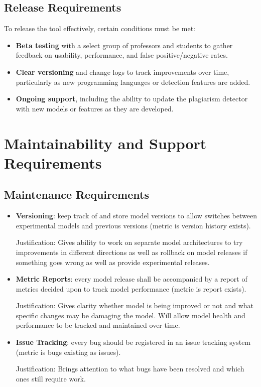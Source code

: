 \documentclass[12pt]{article}
\begin{document}
\subsection{Release Requirements}
To release the tool effectively, certain conditions must be met:
\begin{itemize}
    \item \textbf{Beta testing} with a select group of professors and students to gather feedback on usability, performance, and false positive/negative rates.
    \item \textbf{Clear versioning} and change logs to track improvements over time, particularly as new programming languages or detection features are added.
    \item \textbf{Ongoing support}, including the ability to update the plagiarism detector with new models or features as they are developed.
\end{itemize}

\section{Maintainability and Support Requirements}
\subsection{Maintenance Requirements}
\begin{itemize}
    \item \textbf{Versioning}: keep track of and store model versions to allow
     switches between experimental models and previous versions (metric is 
     version history exists).

    Justification: Gives ability to work on separate model architectures to try 
    improvements in different directions as well as rollback on model releases 
    if something goes wrong as well as provide experimental releases.
    
    \item \textbf{Metric Reports}: every model release shall be accompanied by 
    a report of metrics decided upon to track model performance (metric is 
    report exists).

    Justification: Gives clarity whether model is being improved or not and what
     specific changes may be damaging the model. Will allow model health and 
     performance to be tracked and maintained over time.

    \item \textbf{Issue Tracking}: every bug should be registered in an issue 
    tracking system (metric is bugs existing as issues). 

    Justification: Brings attention to what bugs have been resolved and which 
    ones still require work.
    
\end{itemize}
\end{document}
